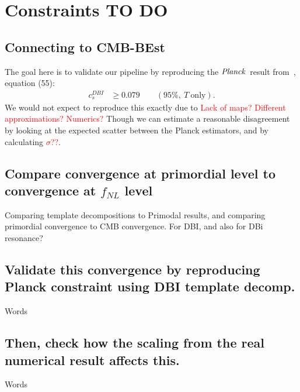 %
\chapter{Constraints TO DO}\label{chapter:constraints}
\section{Connecting to CMB-BEst}
    The goal here is to validate our pipeline by reproducing the $\textit{Planck}$~result
    from~\cite{Planck_NG_2018}, equation (55):
    \begin{align}
        c_s^{DBI}&\ge0.079\qquad(95\%,~T~\text{only}).
    \end{align}
    We would not expect to reproduce this exactly due to
    \textcolor{red}{Lack of maps? Different approximations? Numerics?}
    Though we can estimate a reasonable disagreement by looking at
    the expected scatter between the Planck estimators, and by calculating
    \textcolor{red}{$\sigma$??}.
\section{Compare convergence at primordial level to convergence at $f_{NL}$ level}
    Comparing template decompositions to Primodal results,
    and comparing primordial convergence to CMB convergence.
    For DBI, and also for DBi resonance?
\section{Validate this convergence by reproducing Planck constraint using DBI template decomp.}
    Words
\section{Then, check how the scaling from the real numerical result affects this.}
    Words
